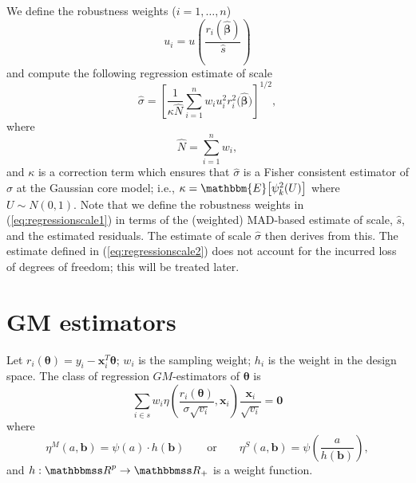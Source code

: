 \documentclass[a4paper,11pt]{scrreprt}
\begin{document}
We define the robustness weights ($i=1, \ldots, n$)
\begin{equation}\label{eq:regressionscale1}
   u_i = u\left(\frac{r_i(\widehat{\bm \beta})}{\widehat{s}}\right)
\end{equation}
\noindent and compute the following regression estimate of scale
\begin{equation}\label{eq:regressionscale2}
   \widehat{\sigma} = \left[ \frac{1}{\kappa \widehat{N}}\sum_{i=1}^n w_i u_i^2 r_i^2\big(\widehat{\bm \beta}\big) \right]^{1/2}, 
\end{equation}
\noindent where 
\begin{equation*}
   \widehat{N} = \sum_{i=1}^n w_i,
\end{equation*}
\noindent and $\kappa$ is a correction term which ensures that $\widehat{\sigma}$ is a Fisher consistent estimator of $\sigma$ at the Gaussian core model; i.e., $\kappa = \mathbbm{E}\big[\psi_k^2(U)\big]$ where $U \sim N(0,1)$. Note that we define the robustness weights in (\ref{eq:regressionscale1}) in terms of the (weighted) MAD-based estimate of scale, $\widehat{s}$, and the estimated residuals. The estimate of scale $\widehat{\sigma}$ then derives from this. The estimate defined in (\ref{eq:regressionscale2}) does not account for the incurred loss of degrees of freedom; this will be treated later. 


\chapter{GM estimators}
Let $r_i(\bm \theta) = y_i - \bm x_i^T \bm \theta$; $w_i$ is the sampling weight; $h_i$ is the weight in the design space. The class of regression $GM$-estimators of $\bm \theta$ is \citep[Chap. 6.3a][]{hampeletal1996}
\begin{equation}
   \sum_{i \in s} w_i \eta \left(\frac{r_i(\bm \theta)}{\sigma \sqrt{v_i}}, \bm x_i\right)  \frac{\bm x_i}{\sqrt{v_i}} = \bm 0
\end{equation}
\noindent where 
\begin{equation*}
   \eta^{M}(a,\bm b) = \psi(a) \cdot h(\bm b) \qquad \text{or} \qquad \eta^{S}(a,\bm b) =   \psi\left(\frac{a}{h(\bm b)}\right), 
\end{equation*}
\noindent and $h:\R^p \rightarrow \R_+$ is a weight function.
\end{document}
